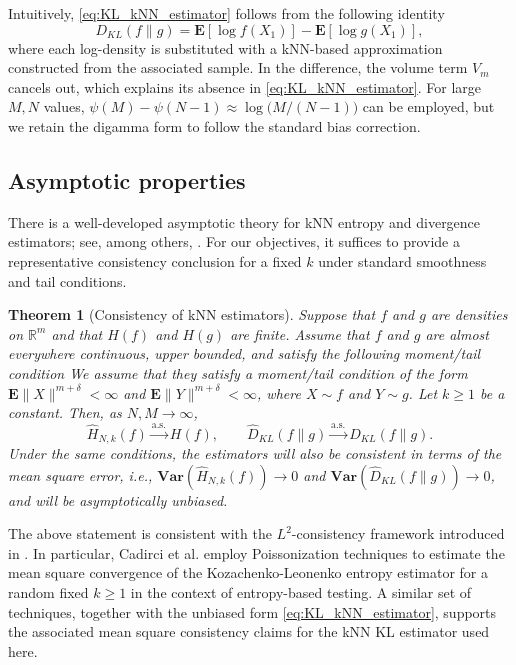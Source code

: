 \documentclass[12pt,a4paper]{article}
\newcommand{\E}{\mathbf {E}}
\newcommand{\Var}{\mathbf{Var}}
\theoremstyle{definition}
\theoremstyle{plain}
\newtheorem{theorem}{Theorem}[section]
\begin{document}
{Intuitively, \eqref{eq:KL_kNN_estimator} follows from the following identity
\[
D_{KL}(f\|g) = \E[\log f(X_1)] - \E[\log g(X_1)],
\]
 where each log-density is substituted with a kNN-based approximation constructed from the associated sample. In the difference, the volume term $V_m$ cancels out, which explains its absence in \eqref{eq:KL_kNN_estimator}. For large $M,N$ values, $\psi(M)-\psi(N-1)\approx \log\!\bigl(M/(N-1)\bigr)$ can be employed, but we retain the digamma form to follow the standard bias correction.

\subsection{Asymptotic properties}
There is a well-developed asymptotic theory for kNN entropy and divergence estimators;
see, among others,
\cite{kozachenko1987,goria2005,leonenko2008,penrose2011,penrose2013,Wang2009,berrett2019a,cadirci2022entropy}.
For our objectives, it suffices to provide a representative consistency conclusion for
a fixed $k$ under standard smoothness and tail conditions.

\begin{theorem}[Consistency of kNN estimators]\label{thm:consistency_nn}
Suppose that $f$ and $g$ are densities on $\mathbb{R}^m$ and that $H(f)$ and $H(g)$ are finite. Assume that $f$ and $g$ are almost everywhere continuous, upper bounded, and satisfy the following moment/tail condition
We assume that they satisfy a moment/tail condition of the form $\E\|X\|^{m+\delta}<\infty$ and $\E\|Y\|^{m+\delta}<\infty$, where $X\sim f$ and $Y\sim g$. Let $k\ge 1$ be a constant. Then, as $N,M\to\infty$,
\[
\widehat{H}_{N,k}(f)\xrightarrow{\text{a.s.}} H(f),
\qquad
\widehat{D}_{KL}(f\|g)\xrightarrow{\text{a.s.}} D_{KL}(f\|g).
\]
Under the same conditions, the estimators will also be consistent in terms of the mean square error, i.e., $\Var(\widehat{H}_{N,k}(f))\to 0$ and $\Var(\widehat{D}_{KL}(f\|g))\to 0$, and will be asymptotically unbiased.
\end{theorem}
The above statement is consistent with the $L^2$-consistency framework introduced in
\cite{penrose2011,penrose2013}. In particular, Cadirci et al.
\cite{cadirci2022entropy} employ Poissonization techniques to estimate the mean square convergence of the Kozachenko-Leonenko entropy estimator for a random fixed $k\ge 1$ in the context of entropy-based testing.
A similar set of techniques, together with the unbiased form
\eqref{eq:KL_kNN_estimator}, supports the associated mean square consistency claims for the kNN KL estimator used here.

}
\end{document}
